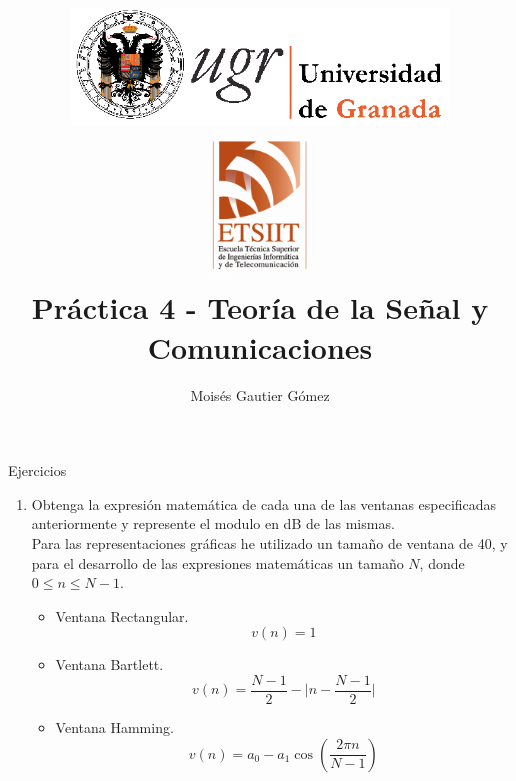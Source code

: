 \documentclass[a4paper,12pt]{article}
\author{Moisés Gautier Gómez}
\title{\includegraphics[width=10cm]{logo_ugr.png} \\ \includegraphics[width=3cm]{fetch.png}\\ Práctica 4 - Teoría de la Señal y Comunicaciones 
}
\date{ }
\begin{document}
\maketitle
Ejercicios
%

\begin{enumerate}
\item Obtenga la expresión matemática de cada una de las ventanas especificadas anteriormente y
represente el modulo en dB de las mismas. \\

Para las representaciones gráficas he utilizado un tamaño de ventana de 40, y para el desarrollo de las expresiones matemáticas un tamaño $N$, donde $0 \leq n \leq N -1$.

\begin{itemize}
\item Ventana Rectangular.
$$v(n) = 1$$
\item Ventana Bartlett.
$$v(n) = \frac{N-1}{2} - \bigg|n - \frac{N-1}{2} \bigg|$$
\item Ventana Hamming.
$$v(n) = a_0 - a_1 \cos(\frac{2 \pi n}{N -1})$$

\end{itemize}
\end{enumerate}
\end{document}
